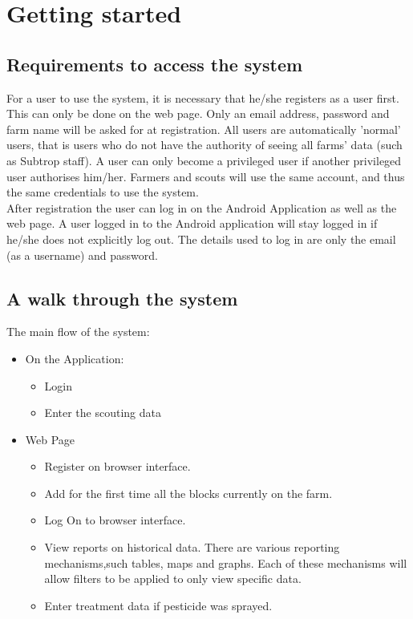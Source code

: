 \documentclass[11pt,a4paper,titlepage]{article}
\begin{document}
\section{Getting started}
\subsection{Requirements to access the system}
For a user to use the system, it is necessary that he/she registers as a user first. This can only be done on the web page. Only an email address, password and farm name will be asked for at registration. All users are automatically 'normal' users, that is users who do not have the authority of seeing all farms' data (such as Subtrop staff). A user can only become a privileged user if another privileged user authorises him/her. Farmers and scouts will use the same account, and thus the same credentials to use the system.\\
After registration the user can log in on the Android Application as well as the web page. A user logged in to the Android application will stay logged in if he/she does not explicitly log out. The details used to log in are only the email (as a username) and password.

\subsection{A walk through the system}
The main flow of the system:
\begin{itemize}
\item On the Application: 
	\begin{itemize}
		\item Login
		\item Enter the scouting data
	\end{itemize}
\item Web Page
	\begin{itemize}
		\item Register on browser interface.
		\item Add for the first time all the blocks currently on the farm.
		\item Log On to browser interface.
		\item View reports on historical data. There are various reporting mechanisms,such tables, maps and graphs. Each of these mechanisms will allow filters to be applied to only view specific data.
\item Enter treatment data if pesticide was sprayed.
	\end{itemize}
\end{itemize}
\end{document}
